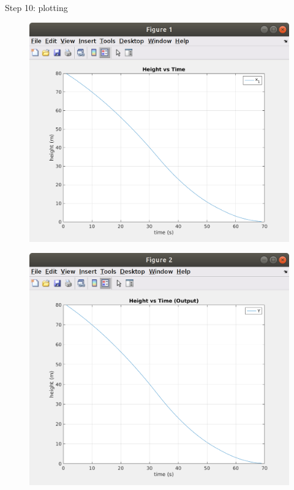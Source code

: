 \documentclass[11pt]{article}
\begin{document}
Step 10: plotting
\begin{figure}[H]
            \centering
            \includegraphics[width=15cm]{fig1.png}
\end{figure}
\begin{figure}[H]
            \centering
            \includegraphics[width=15cm]{fig2.png}
\end{figure}
\end{document}
